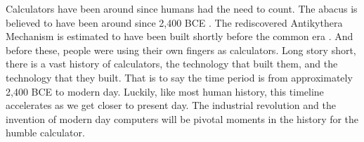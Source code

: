 \documentclass[../computer-history.tex]{subfiles}
\begin{document}
Calculators have been around since humans had the need to count. The abacus is believed to have been around since 2,400 BCE \cite{abacus}. The rediscovered Antikythera Mechanism is estimated to have been built shortly before the common era \cite{Antikythera}. And before these, people were using their own fingers as calculators. Long story short, there is a vast history of calculators, the technology that built them, and the technology that they built. That is to say the time period is from approximately 2,400 BCE to modern day. Luckily, like most human history, this timeline accelerates as we get closer to present day. The industrial revolution and the invention of modern day computers will be pivotal moments in the history for the humble calculator.

\biblio
\end{document}
